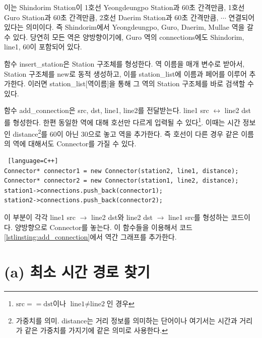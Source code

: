 \documentclass{article}
\begin{document}
이는 Shindorim Station이 1호선 Yeongdeungpo Station과 60초 간격만큼, 1호선 Guro Station과 60초 간격만큼, 2호선 Daerim Station과 60초 간격만큼, $\cdots$ 연결되어 있다는 의미이다. 즉 Shindorim에서 Yeongdeungpo, Guro, Daerim, Mullae 역을 갈 수 있다. 당연히 모든 역은 양방향이기에, Guro 역의 connections에도 Shindorim, line1, 60이 포함되어 있다.

함수 insert\_station은 Station 구조체를 형성한다. 역 이름을 매개 변수로 받아서, Station 구조체를 new로 동적 생성하고, 이를 station\_list에 이름과 페어를 이루어 추가한다. 이러면 station\_list[역이름]을 통해 그 역의 Station 구조체를 바로 검색할 수 있다.

함수 add\_connection은 src, dst, line1, line2를 전달받는다. line1 src $\longleftrightarrow$ line2 dst 를 형성한다. 한편 동일한 역에 대해 호선만 다르게 입력될 수 있다\footnote{$\text{src}==\text{dst}$이나 $\text{line1}\neq\text{line2}$인 경우}. 이때는 시간 정보인 distance\footnote{가중치를 의미. distance는 거리 정보를 의미하는 단어이나 여기서는 시간과 거리가 같은 가중치를 가지기에 같은 의미로 사용한다.}를 60이 아닌 30으로 놓고 역을 추가한다. 즉 호선이 다른 경우 같은 이름의 역에 대해서도 Connector를 가질 수 있다.
\begin{lstlisting} [language=C++]
Connector* connector1 = new Connector(station2, line1, distance);
Connector* connector2 = new Connector(station1, line2, distance);
station1->connections.push_back(connector1);
station2->connections.push_back(connector2);
\end{lstlisting}
이 부분이 각각 line1 src $\rightarrow$ line2 dst와 line2 dst $\rightarrow$ line1 src를 형성하는 코드이다. 양방향으로 Connector를 놓는다. 이 함수들을 이용해서 코드 \ref{lstlinsting:add_connection}에서 역간 그래프를 추가한다.

\section{(a) 최소 시간 경로 찾기}
\end{document}
